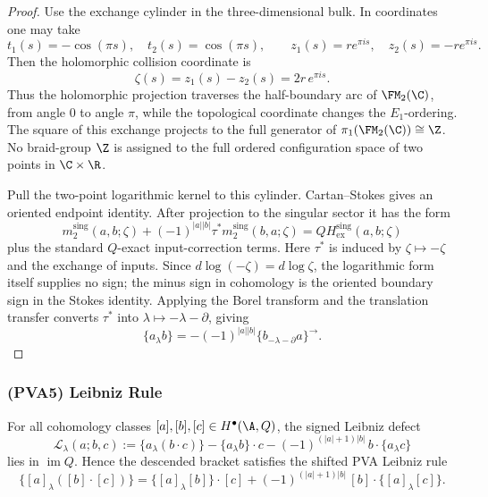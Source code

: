 \begin{proof}
Use the exchange cylinder in the three-dimensional bulk.  In
coordinates one may take
\[
t_1(s)=-\cos(\pi s),\quad t_2(s)=\cos(\pi s),\qquad
z_1(s)=r e^{\pi i s},\quad z_2(s)=-r e^{\pi i s}.
\]
Then the holomorphic collision coordinate is
\[
\zeta(s)=z_1(s)-z_2(s)=2r\,e^{\pi i s}.
\]
Thus the holomorphic projection traverses the half-boundary arc of
\(\FM_2(\C)\), from angle \(0\) to angle \(\pi\), while the
topological coordinate changes the \(E_1\)-ordering.  The square of
this exchange projects to the full generator of
\(\pi_1(\FM_2(\C))\cong\Z\).  No braid-group \(\Z\) is assigned to the
full ordered configuration space of two points in \(\C\times\R\).

Pull the two-point logarithmic kernel to this cylinder.  Cartan--Stokes
gives an oriented endpoint identity.  After projection to the singular
sector it has the form
\[
m_2^{\mathrm{sing}}(a,b;\zeta)
+(-1)^{|a||b|}\tau^\ast m_2^{\mathrm{sing}}(b,a;\zeta)
=QH_{\mathrm{ex}}^{\mathrm{sing}}(a,b;\zeta)
\]
plus the standard \(Q\)-exact input-correction terms.  Here
\(\tau^\ast\) is induced by \(\zeta\mapsto-\zeta\) and the exchange of
inputs.  Since \(d\log(-\zeta)=d\log\zeta\), the logarithmic form
itself supplies no sign; the minus sign in cohomology is the oriented
boundary sign in the Stokes identity.  Applying the Borel transform and
the translation transfer converts \(\tau^\ast\) into
\(\lambda\mapsto-\lambda-\partial\), giving
\[
\{a_\lambda b\}
= -(-1)^{|a||b|}\{b_{-\lambda-\partial}a\}^{\to}.
\]
\end{proof}

\subsubsection{(PVA5) Leibniz Rule}

\begin{proposition}
For all cohomology classes \([a],[b],[c]\in H^\bullet(\A,Q)\), the
signed Leibniz defect
\[
\mathcal L_\lambda(a;b,c)
:=
\{a_\lambda(b\cdot c)\}
-
\{a_\lambda b\}\cdot c
-
(-1)^{(|a|+1)|b|}\,b\cdot\{a_\lambda c\}
\]
lies in \(\operatorname{im}Q\). Hence the descended bracket satisfies
the shifted PVA Leibniz rule
\[
\{[a]_\lambda([b]\cdot[c])\}
=
\{[a]_\lambda[b]\}\cdot[c]
+
(-1)^{(|a|+1)|b|}\,[b]\cdot\{[a]_\lambda[c]\}.
\]
\end{proposition}

